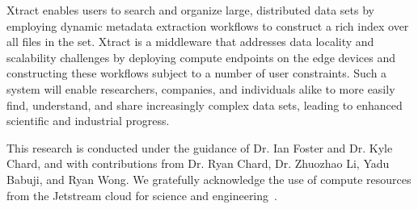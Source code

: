 \documentclass[sigconf, 9pt]{acmart}
\newcommand{\name}{Xtract}
\begin{document}
\name{} enables users to search and organize large, distributed data sets by employing dynamic metadata extraction workflows to construct a rich index over all files in the set.
\name{} is a middleware that addresses data locality and scalability challenges by deploying compute endpoints on the edge
devices and constructing these workflows subject to a number of user constraints. Such a system will enable researchers, companies, and individuals alike to more easily find, understand, and share increasingly 
complex data sets, leading to enhanced scientific and industrial progress. 


\begin{acks}

This research is conducted under the guidance of Dr. Ian Foster and Dr. Kyle Chard, and with contributions
from Dr. Ryan Chard, Dr. Zhuozhao Li, Yadu Babuji, and Ryan Wong. We gratefully acknowledge the use of compute 
resources from the Jetstream cloud for science and engineering~\cite{jetstream}.


\end{acks}


\end{document}
